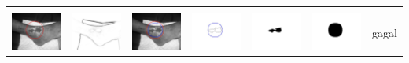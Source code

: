 \begin{table}[H]
\begin{tabular}{|m{0.7in}|m{0.7in}|m{0.7in}|m{0.7in}|m{0.7in}|m{0.7in}|m{0.7in}|}
		&  &  & & & &  \\
		\includegraphics[width=0.7in]{dataset/dataset_3/luka_merah/ready/10_integer_init.jpg}&
		\includegraphics[width=0.7in]{dataset/dataset_3/luka_merah/ready/10_integer_ext.jpg}&
		\includegraphics[width=0.7in]{dataset/dataset_3/luka_merah/ready/10_integer_result.jpg}&
		\includegraphics[width=0.7in]{dataset/dataset_3/luka_merah/ready/10_gt_r_integer.jpg}&
		\includegraphics[width=0.7in]{dataset/dataset_3/luka_merah/ready/10_r.jpg}&
		\includegraphics[width=0.7in]{dataset/dataset_3/luka_merah/ready/10_integer_r.jpg}&
		gagal\\
		\hline
		

\end{tabular}
\end{table}

